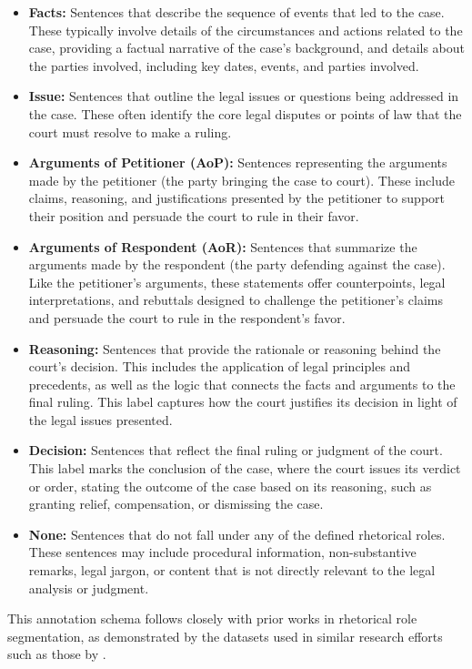 \begin{itemize}
    \item \textbf{Facts:} Sentences that describe the sequence of events that led to the case. These typically involve details of the circumstances and actions related to the case, providing a factual narrative of the case’s background, and details about the parties involved, including key dates, events, and parties involved.

    \item \textbf{Issue:} Sentences that outline the legal issues or questions being addressed in the case. These often identify the core legal disputes or points of law that the court must resolve to make a ruling.
 
    \item \textbf{Arguments of Petitioner (AoP):} Sentences representing the arguments made by the petitioner (the party bringing the case to court). These include claims, reasoning, and justifications presented by the petitioner to support their position and persuade the court to rule in their favor.   
    
    \item \textbf{Arguments of Respondent (AoR):} Sentences that summarize the arguments made by the respondent (the party defending against the case). Like the petitioner's arguments, these statements offer counterpoints, legal interpretations, and rebuttals designed to challenge the petitioner’s claims and persuade the court to rule in the respondent’s favor.
    
    \item \textbf{Reasoning:} Sentences that provide the rationale or reasoning behind the court's decision. This includes the application of legal principles and precedents, as well as the logic that connects the facts and arguments to the final ruling. This label captures how the court justifies its decision in light of the legal issues presented.

    \item \textbf{Decision:} Sentences that reflect the final ruling or judgment of the court. This label marks the conclusion of the case, where the court issues its verdict or order, stating the outcome of the case based on its reasoning, such as granting relief, compensation, or dismissing the case.
    
    \item \textbf{None:} Sentences that do not fall under any of the defined rhetorical roles. These sentences may include procedural information, non-substantive remarks, legal jargon, or content that is not directly relevant to the legal analysis or judgment.
\end{itemize}


This annotation schema follows closely with prior works in rhetorical role segmentation, as demonstrated by the datasets used in similar research efforts such as those by \citet{bhattacharya2019identification, kalamkar-etal-2022-corpus, malik-etal-2022-semantic}.
